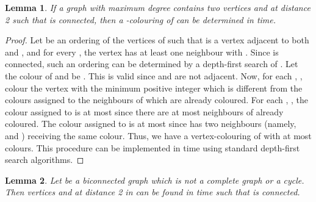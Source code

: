 \documentclass{article}
\newtheorem{lemma}{Lemma}
\begin{document}
\begin{lemma}
\label{lem:SequentialColouring}
If a graph  with maximum degree  contains two vertices  and 
at distance 2 such that  is connected, then a
-colouring of  can be determined in  time.
\end{lemma}
\begin{proof}
Let  be an ordering of the vertices of
 such that  is a vertex adjacent to both  and ,
and for every , the vertex  has at least one neighbour  with
. Since  is connected, such an ordering can be
determined by a depth-first search of . Let the colour of
 and  be . This is valid since  and  are not adjacent. Now, for
each , , colour the vertex  with the minimum positive
integer  which is different from the colours assigned to the neighbours of
 which are already coloured. For each , , the colour
assigned to  is at most  since there are at most 
neighbours of  already coloured. The  colour assigned to  is at most
 since  has two neighbours (namely,  and ) receiving the
same colour. Thus, we have a vertex-colouring of  with at most 
colours. This procedure can be implemented in  time using standard
depth-first search algorithms. 
\end{proof}

\begin{lemma}
\label{lem:FindAB}
Let  be a biconnected graph which is not a complete graph or a cycle.
Then vertices  and  at distance 2 in  can be found in 
time such that  is connected.
\end{lemma}
\end{document}
